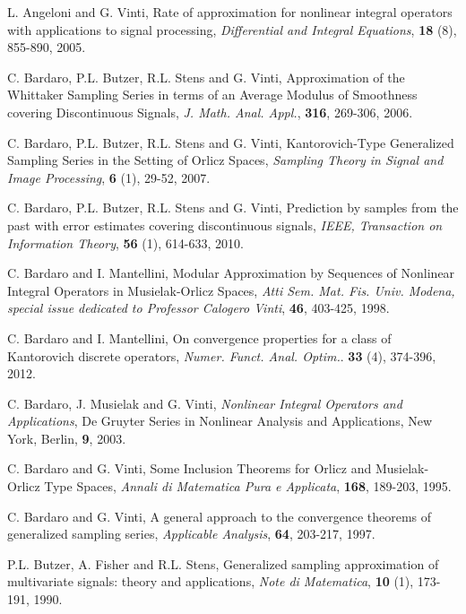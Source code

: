 \documentclass[11pt,a4paper]{article}
\begin{document}
\begin{thebibliography}{99}

{ \small

 L. Angeloni and G. Vinti, Rate of approximation  for nonlinear integral operators with applications to signal processing, {\em Differential and Integral Equations}, {\bf 18} (8), 855-890, 2005.

 C. Bardaro, P.L. Butzer, R.L. Stens and G. Vinti, Approximation of the Whittaker Sampling Series in terms of an Average Modulus of Smoothness covering Discontinuous Signals, {\em J. Math. Anal. Appl.}, {\bf 316}, 269-306, 2006.

 C. Bardaro, P.L. Butzer, R.L. Stens and G. Vinti, Kantorovich-Type Generalized Sampling Series in the Setting of Orlicz Spaces, {\em Sampling Theory in Signal and Image Processing}, {\bf 6} (1), 29-52, 2007.

 C. Bardaro, P.L. Butzer, R.L. Stens and G. Vinti, Prediction by samples from the past with error estimates covering discontinuous signals, {\em IEEE, Transaction on Information Theory}, {\bf 56} (1), 614-633, 2010. 

 C. Bardaro and I. Mantellini, Modular Approximation by Sequences of Nonlinear Integral Operators in Musielak-Orlicz Spaces, {\em Atti Sem. Mat. Fis. Univ. Modena, special issue dedicated to Professor Calogero Vinti},  {\bf 46}, 403-425, 1998.

 C. Bardaro and I. Mantellini, On convergence properties for a class of Kantorovich discrete operators, {\em Numer. Funct. Anal. Optim.}. {\bf 33} (4), 374-396, 2012.

 C. Bardaro, J. Musielak and G. Vinti, {\em Nonlinear Integral Operators and Applications}, De Gruyter Series in Nonlinear Analysis and Applications, New York, Berlin, {\bf 9}, 2003.

 C. Bardaro and G. Vinti, Some Inclusion Theorems for Orlicz and Musielak-Orlicz Type Spaces, {\em Annali di Matematica Pura e Applicata}, {\bf 168}, 189-203, 1995.

 C. Bardaro and G. Vinti, A general approach to the convergence theorems of generalized sampling series, {\em Applicable Analysis}, {\bf 64}, 203-217, 1997.

 P.L. Butzer, A. Fisher and R.L. Stens, Generalized
sampling approximation of multivariate signals: theory and
applications, {\em Note di Matematica}, {\bf 10} (1), 173-191, 1990.

}
\end{thebibliography}
\end{document}

